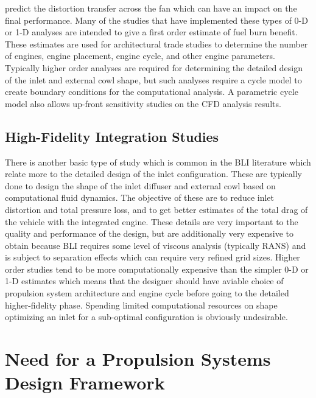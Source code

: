 predict the distortion transfer across the fan which can have an impact on the final performance.  Many of the studies that have implemented these types of 0-D or 1-D analyses are intended to give a first order estimate of fuel burn benefit. These estimates are used for architectural trade studies to determine the number of engines, engine placement, engine cycle, and other engine parameters. Typically higher order analyses are required for determining the detailed design of the inlet and external cowl shape, but such analyses require a cycle model to create boundary conditions for the computational analysis. A parametric cycle model also allows up-front sensitivity studies on the CFD analysis results.

\subsection{High-Fidelity Integration Studies}

There is another basic type of study which is common in the BLI literature which relate more to the detailed design of the inlet configuration. These are typically done to design the shape of the inlet diffuser and external cowl based on computational fluid dynamics. The objective of these are to reduce inlet distortion and total pressure loss, and to get better estimates of the total drag of the vehicle with the integrated engine.  These details are very important to the quality and performance of the design, but are additionally very expensive to obtain because BLI requires some level of viscous analysis (typically RANS) and is subject to separation effects which can require very refined grid sizes. Higher order studies tend to be more computationally expensive than the simpler 0-D or 1-D estimates which means that the designer should have aviable choice of propulsion system architecture and engine cycle before going to the detailed higher-fidelity phase. Spending limited computational resources on shape optimizing an inlet for a sub-optimal configuration is obviously undesirable.

\section{Need for a Propulsion Systems Design Framework}

